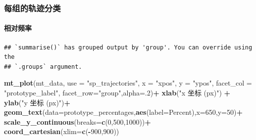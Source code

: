 \documentclass[
]{article}
\newenvironment{Shaded}{\begin{snugshade}}{\end{snugshade}}
\newcommand{\AttributeTok}[1]{\textcolor[rgb]{0.13,0.29,0.53}{#1}}
\newcommand{\DecValTok}[1]{\textcolor[rgb]{0.00,0.00,0.81}{#1}}
\newcommand{\FunctionTok}[1]{\textcolor[rgb]{0.13,0.29,0.53}{\textbf{#1}}}
\newcommand{\NormalTok}[1]{#1}
\newcommand{\OtherTok}[1]{\textcolor[rgb]{0.56,0.35,0.01}{#1}}
\newcommand{\SpecialCharTok}[1]{\textcolor[rgb]{0.81,0.36,0.00}{\textbf{#1}}}
\newcommand{\StringTok}[1]{\textcolor[rgb]{0.31,0.60,0.02}{#1}}
\begin{document}
\subsubsection{每组的轨迹分类}\label{ux6bcfux7ec4ux7684ux8f68ux8ff9ux5206ux7c7b-1}

\paragraph{相对频率}\label{ux76f8ux5bf9ux9891ux7387-2}

\begin{Shaded}
\end{Shaded}

\begin{verbatim}
## `summarise()` has grouped output by 'group'. You can override using the
## `.groups` argument.
\end{verbatim}

\begin{Shaded}
\begin{Highlighting}[]
\FunctionTok{mt\_plot}\NormalTok{(mt\_data, }\AttributeTok{use =} \StringTok{"sp\_trajectories"}\NormalTok{,}
  \AttributeTok{x =} \StringTok{"xpos"}\NormalTok{, }\AttributeTok{y =} \StringTok{"ypos"}\NormalTok{, }\AttributeTok{facet\_col =} \StringTok{"prototype\_label"}\NormalTok{, }\AttributeTok{facet\_row=}\StringTok{"group"}\NormalTok{,}\AttributeTok{alpha=}\NormalTok{.}\DecValTok{2}\NormalTok{)}\SpecialCharTok{+}
  \FunctionTok{xlab}\NormalTok{(}\StringTok{"x 坐标 (px)"}\NormalTok{) }\SpecialCharTok{+} \FunctionTok{ylab}\NormalTok{(}\StringTok{"y 坐标 (px)"}\NormalTok{)}\SpecialCharTok{+} 
  \FunctionTok{geom\_text}\NormalTok{(}\AttributeTok{data=}\NormalTok{prototype\_percentages,}\FunctionTok{aes}\NormalTok{(}\AttributeTok{label=}\NormalTok{Percent),}\AttributeTok{x=}\DecValTok{650}\NormalTok{,}\AttributeTok{y=}\DecValTok{50}\NormalTok{)}\SpecialCharTok{+}
  \FunctionTok{scale\_y\_continuous}\NormalTok{(}\AttributeTok{breaks=}\FunctionTok{c}\NormalTok{(}\DecValTok{0}\NormalTok{,}\DecValTok{500}\NormalTok{,}\DecValTok{1000}\NormalTok{))}\SpecialCharTok{+} 
  \FunctionTok{coord\_cartesian}\NormalTok{(}\AttributeTok{xlim=}\FunctionTok{c}\NormalTok{(}\SpecialCharTok{{-}}\DecValTok{900}\NormalTok{,}\DecValTok{900}\NormalTok{))}
\end{Highlighting}
\end{Shaded}
\end{document}
